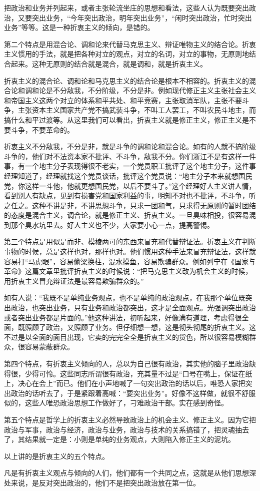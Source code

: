 把政治和业务并列起来，或者主张轮流坐庄的思想和看法，这些人认为既要突出政治，又要突出业务，“今年突出政治，明年突出业务”，“闲时突出政治，忙时突出业务”等等。这是一种折衷主义的倾向，是错的。

第二个特点是用混合论、调和论来代替马克思主义、辩证唯物主义的结合论。折衷主义惯用的手法，就是把各种对立的观点，对立的名词，对立的事物，无原则地结合起来。这种无原则的结合就是混合，就是调和，就是折衷主义。

折衷主义的混合论、调和论和马克思主义的结合论是根本不相容的。折衷主义的混合论和调和论是不分敌我，不分阶级，不分是非。例如现代修正主义主张社会主义和帝国主义这两个对立的体系和平共处、和平竞赛，主张取消军队，主张不要斗争，主张资本主义国家共产党不搞武装斗争，不叫工人罢工，不叫农民斗地主，而搞什么和平过渡等。从这里我们可以看出，折衷主义就是修正主义，修正主义是不要斗争，不要革命的。

折衷主义不分敌我，不分是非，就是斗争的调和论和混合论。如有的人就不搞阶级斗争的，他们对不法资本家不批评、不斗争，敌我不分。你们浙江不是有这样一件事，有一个地主分子表现得很不老实，一个党员职工批评了这个地主分子，这件事经理知道了，经理就找这个党员谈话，批评这个党员说：“地主分子本来就想国民党，你这样一斗他，他就更想国民党，以后不要斗了。”这个经理好人主义讲人情，看到别人有缺点，见到有损害党和国家利益的事，明知不对也不批评，不斗争，听之任之。这种不讲是非，不讲思想斗争，只求一团和气，只求得无原则的暂时团结的态度是混合主义，调合论，就是修正主义、折衷主义。一旦臭味相投，很容易混到那个臭水坑里去。好人主义也不少，大家要小心一点，提高警惕。

第三个特点是用似是而非、模棱两可的东西来冒充和代替辩证法。折衷主义在判断事物的时候，总是这样也对，那样也对。他们惯用这种手法来冒充辩证法，这样就容易打“马虎眼”，容易偷梁换柱，混水摸鱼，容易欺骗群众。例如列宁在《国家与革命》这篇文章里批评折衷主义的时候说：“把马克思主义改为机会主义的时候，用折衷主义冒充辩证法是最容易欺骗群众的。”

如有人说：“我既不是单纯业务观点，也不是单纯的政治观点，在我那个单位既突出政治，也突出业务，只有业务和政治都突出，这才是全面观点。光强调突出政治或者突出业务都是片面的。”他这种讲法，初听起来，好像满有道理，考虑得很全面，既照顾了政治，又照顾了业务。但仔细想一想，这是彻头彻尾的折衷主义。这不过是以全面的面目出现，它卖的完完全全是折衷主义的货色，所以很容易模糊群众，很容易蒙蔽群众。

第四个特点，有折衷主义倾向的人，总以为自己很有政治，其实他的脑子里政治缺得很，少得可怜。这些同志所谓很有政治，充其量不过是“口号在嘴上，保证在纸上，决心在会上”而已。他们在小声地喊了一句突出政治的话以后，唯恐人家把突出政治的话听去了，于是紧跟着高喊：“要突出业务”。好像不这样做，就很不舒服似的，这些人唯恐政治思想工作做好了，刁难政治干部。实在感到奇怪。

第五个特点是哲学上的折衷主义必然导致政治上的机会主义、修正主义。因为它把政治与军事，政治与经济，政治与业务，政治与技术的关系搞错了，把灵魂抽去了，其结果就一定是：小则是单纯的业务观点，大则陷入修正主义的泥坑。

以上讲的是折衷主义的五个特点。

凡是有折衷主义观点与倾向的人们，他们都有一个共同之点，这就是从他们思想深处来说，是反对突出政治的，他们不是把突出政治放在第一位。

